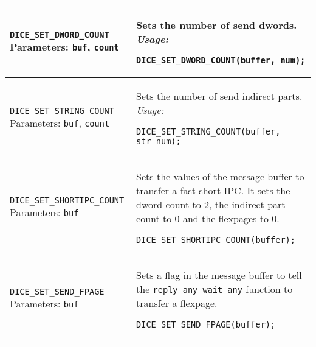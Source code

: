 {\begin{longtable}{|p{4.5cm}|p{9cm}|}
\verb|DICE_SET_DWORD_COUNT|
\newline
Parameters: \verb|buf|, \verb|count| &
Sets the number of send dwords.
\newline
\it Usage:
\begin{verbatim}
DICE_SET_DWORD_COUNT(buffer, num);
\end{verbatim}
\\ \hline

\verb|DICE_SET_STRING_COUNT|
\newline
Parameters: \verb|buf|, \verb|count| &
Sets the number of send indirect parts.
\newline
\it Usage:
\begin{verbatim}
DICE_SET_STRING_COUNT(buffer, str_num);
\end{verbatim}
\\ \hline

\verb|DICE_SET_SHORTIPC_COUNT|
\newline
Parameters: \verb|buf| &
Sets the values of the message buffer to transfer a
fast short IPC. It sets the dword count to 2, the
indirect part count to 0 and the flexpages to 0.
\newline
\begin{verbatim}
DICE_SET_SHORTIPC_COUNT(buffer);
\end{verbatim}
\\ \hline

\verb|DICE_SET_SEND_FPAGE|
\newline
Parameters: \verb|buf| &
Sets a flag in the message buffer to tell the 
\verb|reply_any_wait_any| function to transfer a
flexpage.
\newline
\begin{verbatim}
DICE_SET_SEND_FPAGE(buffer);
\end{verbatim}
\\ \hline
				

\end{longtable}
}

